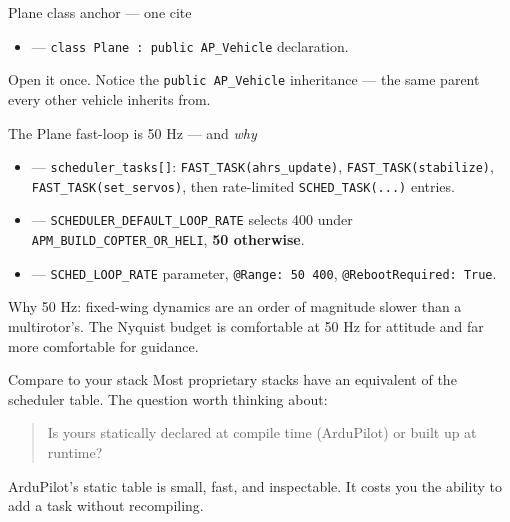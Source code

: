 \documentclass[aspectratio=169,11pt]{beamer}
\begin{document}
\begin{frame}[allowframebreaks]{Plane class anchor --- one cite}
  \begin{itemize}
    \item {} --- \texttt{class Plane : public AP\_Vehicle} declaration.
  \end{itemize}
  \vfill
  Open it once. Notice the \texttt{public AP\_Vehicle} inheritance --- the same parent every other vehicle inherits from.
\end{frame}

\begin{frame}[allowframebreaks]{The Plane fast-loop is 50 Hz --- and \emph{why}}
  \begin{itemize}
    \item {} --- \texttt{scheduler\_tasks[]}: \texttt{FAST\_TASK(ahrs\_update)}, \texttt{FAST\_TASK(stabilize)}, \texttt{FAST\_TASK(set\_servos)}, then rate-limited \texttt{SCHED\_TASK(...)} entries.
    \item {} --- \texttt{SCHEDULER\_DEFAULT\_LOOP\_RATE} selects 400 under \texttt{APM\_BUILD\_COPTER\_OR\_HELI}, \textbf{50 otherwise}.
    \item {} --- \texttt{SCHED\_LOOP\_RATE} parameter, \texttt{@Range: 50 400}, \texttt{@RebootRequired: True}.
  \end{itemize}
  \vfill
  Why 50 Hz: fixed-wing dynamics are an order of magnitude slower than a multirotor's. The Nyquist budget is comfortable at 50 Hz for attitude and far more comfortable for guidance.
\end{frame}

\begin{frame}[allowframebreaks]{Compare to your stack}
  Most proprietary stacks have an equivalent of the scheduler table.
  \vfill
  The question worth thinking about:
  \begin{quote}
    Is yours statically declared at compile time (ArduPilot) or built up at runtime?
  \end{quote}
  \vfill
  ArduPilot's static table is small, fast, and inspectable. It costs you the ability to add a task without recompiling.
\end{frame}
\end{document}
